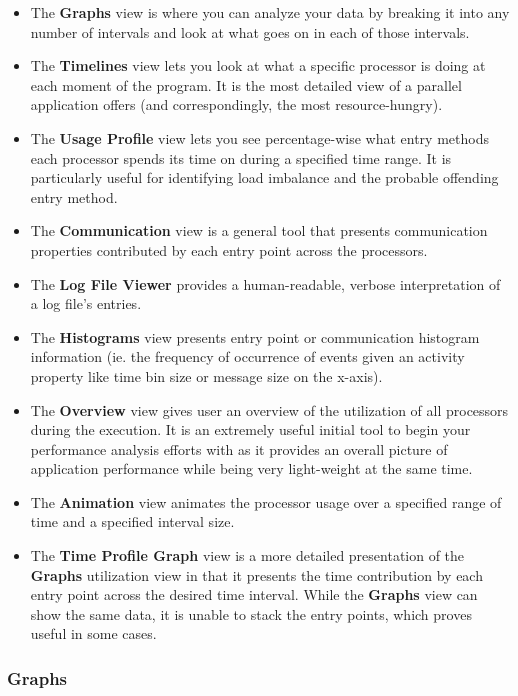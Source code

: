 \documentclass[10pt]{article}
\begin{document}
\begin{itemize}
\item 
The {\bf Graphs} view is where you can analyze your data by breaking it
into any number of intervals and look at what goes on in each of those
intervals.
\item
The {\bf Timelines} view lets you look at what a specific processor is
doing at each moment of the program. It is the most detailed view of a
parallel application \projections{} offers (and correspondingly, the
most resource-hungry).
\item
The {\bf Usage Profile} view lets you see percentage-wise what entry
methods each processor spends its time on during a specified time range.
It is particularly useful for identifying load imbalance and the probable
offending entry method.
\item
The {\bf Communication} view is a general tool that presents
communication properties contributed by each entry point across the
processors.
\item
The {\bf Log File Viewer} provides a human-readable, verbose
interpretation of a log file's entries.
\item
The {\bf Histograms} view presents entry point or communication
histogram information (ie. the frequency of occurrence of events given
an activity property like time bin size or message size on the
x-axis).
\item
The {\bf Overview} view gives user an overview of the utilization of
all processors during the execution. It is an extremely useful initial
tool to begin your performance analysis efforts with as it provides an
overall picture of application performance while being very
light-weight at the same time.
\item
The {\bf Animation} view animates the processor usage over a specified
range of time and a specified interval size.
\item
The {\bf Time Profile Graph} view is a more detailed presentation of
the {\bf Graphs} utilization view in that it presents the time
contribution by each entry point across the desired time
interval. While the {\bf Graphs} view can show the same data, it is
unable to stack the entry points, which proves useful in some cases.
\end{itemize}

\subsubsection{Graphs}
\label{sec::graph view}
\end{document}
